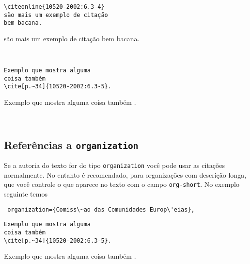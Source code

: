\documentclass[espacosimples]{abnt}
\newcommand{\VerbL}{0.54\textwidth}
\newcommand{\LatL}{0.45\textwidth}
\begin{document}
\noindent\begin{minipage}[t]{\VerbL}\small\begin{verbatim}
\citeonline{10520-2002:6.3-4}
são mais um exemplo de citação
bem bacana.
\end{verbatim}\end{minipage}\begin{minipage}[t]{\LatL}\small
{}
são mais um exemplo de citação
bem bacana.
\end{minipage}\vspace{5mm}\\

\noindent\begin{minipage}[t]{\VerbL}\small\begin{verbatim}
Exemplo que mostra alguma
coisa também
\cite[p.~34]{10520-2002:6.3-5}.
\end{verbatim}\end{minipage}\begin{minipage}[t]{\LatL}\small
Exemplo que mostra alguma
coisa também
\cite[p.~34]{10520-2002:6.3-5}.
\end{minipage}\vspace{5mm}\\

\subsection{Referências a {\tt organization}}

Se a autoria do texto for do tipo {\tt organization} você pode usar
as citações normalmente. No entanto é recomendado, para organizações com
descrição longa, que você controle o que aparece no texto com o campo {\tt org-short}.
No exemplo seguinte temos
\begin{verbatim}
 organization={Comiss\~ao das Comunidades Europ\'eias},
\end{verbatim}

\noindent\begin{minipage}[t]{\VerbL}\small\begin{verbatim}
Exemplo que mostra alguma
coisa também
\cite[p.~34]{10520-2002:6.3-5}.
\end{verbatim}\end{minipage}\begin{minipage}[t]{\LatL}\small
Exemplo que mostra alguma
coisa também
\cite[p.~34]{10520-2002:6.3-5}.
\end{minipage}\vspace{5mm}\\
\end{document}
